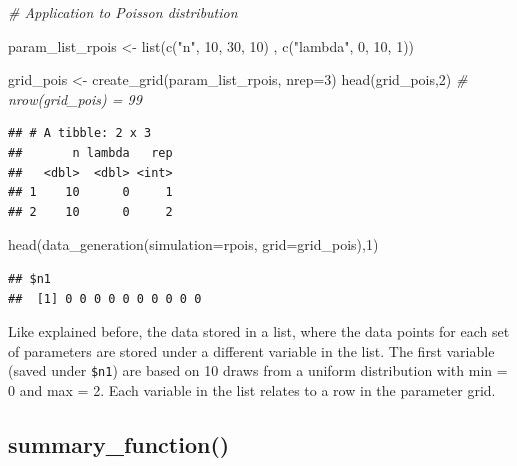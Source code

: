 \documentclass[11pt,a4paper]{article}
\newenvironment{Shaded}{\begin{snugshade}}{\end{snugshade}}
\newcommand{\AttributeTok}[1]{\textcolor[rgb]{0.77,0.63,0.00}{#1}}
\newcommand{\CommentTok}[1]{\textcolor[rgb]{0.56,0.35,0.01}{\textit{#1}}}
\newcommand{\DecValTok}[1]{\textcolor[rgb]{0.00,0.00,0.81}{#1}}
\newcommand{\FunctionTok}[1]{\textcolor[rgb]{0.00,0.00,0.00}{#1}}
\newcommand{\NormalTok}[1]{#1}
\newcommand{\OtherTok}[1]{\textcolor[rgb]{0.56,0.35,0.01}{#1}}
\newcommand{\StringTok}[1]{\textcolor[rgb]{0.31,0.60,0.02}{#1}}
\begin{document}
\begin{Shaded}
\begin{Highlighting}[]
\CommentTok{\# Application to Poisson distribution}

\NormalTok{param\_list\_rpois }\OtherTok{\textless{}{-}} \FunctionTok{list}\NormalTok{(}\FunctionTok{c}\NormalTok{(}\StringTok{"n"}\NormalTok{, }\DecValTok{10}\NormalTok{, }\DecValTok{30}\NormalTok{, }\DecValTok{10}\NormalTok{)}
\NormalTok{                         , }\FunctionTok{c}\NormalTok{(}\StringTok{"lambda"}\NormalTok{, }\DecValTok{0}\NormalTok{, }\DecValTok{10}\NormalTok{, }\DecValTok{1}\NormalTok{))}

\NormalTok{grid\_pois }\OtherTok{\textless{}{-}} \FunctionTok{create\_grid}\NormalTok{(param\_list\_rpois, }\AttributeTok{nrep=}\DecValTok{3}\NormalTok{)}
\FunctionTok{head}\NormalTok{(grid\_pois,}\DecValTok{2}\NormalTok{) }\CommentTok{\# nrow(grid\_pois) = 99}
\end{Highlighting}
\end{Shaded}

\begin{verbatim}
## # A tibble: 2 x 3
##       n lambda   rep
##   <dbl>  <dbl> <int>
## 1    10      0     1
## 2    10      0     2
\end{verbatim}

\begin{Shaded}
\begin{Highlighting}[]
\FunctionTok{head}\NormalTok{(}\FunctionTok{data\_generation}\NormalTok{(}\AttributeTok{simulation=}\NormalTok{rpois, }\AttributeTok{grid=}\NormalTok{grid\_pois),}\DecValTok{1}\NormalTok{)}
\end{Highlighting}
\end{Shaded}

\begin{verbatim}
## $n1
##  [1] 0 0 0 0 0 0 0 0 0 0
\end{verbatim}

Like explained before, the data stored in a list, where the data points
for each set of parameters are stored under a different variable in the
list. The first variable (saved under \texttt{\$n1}) are based on 10
draws from a uniform distribution with min = 0 and max = 2. Each
variable in the list relates to a row in the parameter grid.

\hypertarget{summary_function}{%
\subsection{summary\_function()}\label{summary_function}}
\end{document}
